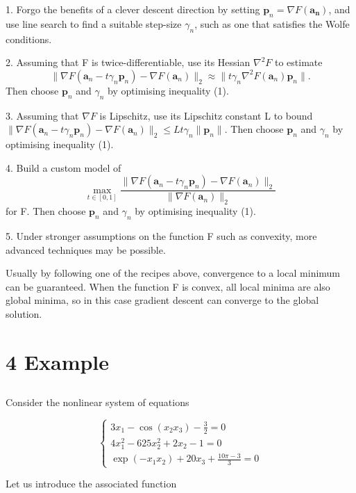 \documentclass[11pt]{article}
\begin{document}
    1. Forgo the benefits of a clever descent direction by setting \( \mathbf {p} _{n}=\nabla F(\mathbf {a_n} )\), and use line search to find a suitable step-size \(\gamma _n\), such as one that satisfies the Wolfe conditions.
    
    2. Assuming that F is twice-differentiable, use its Hessian \(\nabla ^{2}F\) to estimate \[ \|\nabla F(\mathbf {a} _{n}-t\gamma _{n}\mathbf {p} _{n})-\nabla F(\mathbf{a}_{n})\|_{2}\approx \|t\gamma _{n}\nabla ^{2}F(\mathbf {a} _{n})\mathbf {p} _{n}\|.\] Then choose \( \mathbf {p} _{n}\) and \(\gamma _{n}\) by optimising inequality (1).
    
    3. Assuming that \(\nabla F\) is Lipschitz, use its Lipschitz constant L to bound \( \|\nabla F(\mathbf {a} _{n}-t\gamma _{n}\mathbf {p} _{n})-\nabla F(\mathbf {a} _{n})\|_{2}\leq Lt\gamma _{n}\|\mathbf {p} _{n}\|.\) Then choose \(\mathbf {p} _{n}\) and \( \gamma _{n}\) by optimising inequality (1).
    
    4. Build a custom model of \[ \max _{t\in [0,1]}{\frac {\|\nabla F(\mathbf {a} _{n}-t\gamma _{n}\mathbf {p} _{n})-\nabla F(\mathbf {a} _{n})\|_{2}}{\|\nabla F(\mathbf {a} _{n})\|_{2}}}\] for F. Then choose \(\mathbf {p} _{n}\) and \(\gamma _{n}\) by optimising inequality (1).
    
    5. Under stronger assumptions on the function F such as convexity, more advanced techniques may be possible.

Usually by following one of the recipes above, convergence to a local minimum can be guaranteed. When the function F is convex, all local minima are also global minima, so in this case gradient descent can converge to the global solution. 
\section*{4 Example}
\subsection*{}
Consider the nonlinear system of equations

    \[{\begin{cases}3x_{1}-\cos(x_{2}x_{3})-{\tfrac {3}{2}}=0\\4x_{1}^{2}-625x_{2}^{2}+2x_{2}-1=0\\\exp(-x_{1}x_{2})+20x_{3}+{\tfrac {10\pi -3}{3}}=0\end{cases}}\]

Let us introduce the associated function
\end{document}
